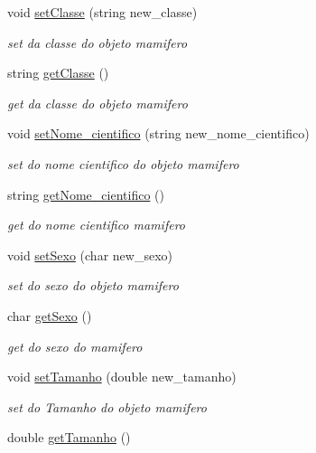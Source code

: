 \begin{DoxyCompactItemize}
void \mbox{\hyperlink{class_mamifero_adfef03fea98466634d10d1db6556f63f}{set\+Classe}} (string new\+\_\+classe)
\begin{DoxyCompactList}\small\item\em set da classe do objeto mamifero \end{DoxyCompactList}\item 
string \mbox{\hyperlink{class_mamifero_a2cb8e1f8125258af51bf18f82d68c085}{get\+Classe}} ()
\begin{DoxyCompactList}\small\item\em get da classe do objeto mamifero \end{DoxyCompactList}\item 
void \mbox{\hyperlink{class_mamifero_a5d3a36f1a5d26bde0b55b64ff79c4aaf}{set\+Nome\+\_\+cientifico}} (string new\+\_\+nome\+\_\+cientifico)
\begin{DoxyCompactList}\small\item\em set do nome cientifico do objeto mamifero \end{DoxyCompactList}\item 
string \mbox{\hyperlink{class_mamifero_a5b1fc11777727a972a339cc0f3af0425}{get\+Nome\+\_\+cientifico}} ()
\begin{DoxyCompactList}\small\item\em get do nome cientifico mamifero \end{DoxyCompactList}\item 
void \mbox{\hyperlink{class_mamifero_a4daad134f55abaa51861dacae622563f}{set\+Sexo}} (char new\+\_\+sexo)
\begin{DoxyCompactList}\small\item\em set do sexo do objeto mamifero \end{DoxyCompactList}\item 
char \mbox{\hyperlink{class_mamifero_ad56b34c987136bc96f15c599e874eb6e}{get\+Sexo}} ()
\begin{DoxyCompactList}\small\item\em get do sexo do mamifero \end{DoxyCompactList}\item 
void \mbox{\hyperlink{class_mamifero_a945945661249935a96effebd8f8b2367}{set\+Tamanho}} (double new\+\_\+tamanho)
\begin{DoxyCompactList}\small\item\em set do Tamanho do objeto mamifero \end{DoxyCompactList}\item 
double \mbox{\hyperlink{class_mamifero_a2f0870f33c6fba6da5784dbcb9afea8a}{get\+Tamanho}} ()

\end{DoxyCompactItemize}
